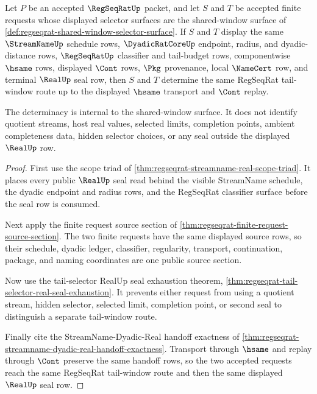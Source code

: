 \begin{theorem}
\label{thm:regseqrat-shared-window-selector-determinacy}
Let $P$ be an accepted $\RegSeqRatUp$ packet, and let $S$ and $T$ be accepted finite requests whose displayed selector surfaces are the shared-window surface of \autoref{def:regseqrat-shared-window-selector-surface}. If $S$ and $T$ display the same $\StreamNameUp$ schedule rows, $\DyadicRatCoreUp$ endpoint, radius, and dyadic-distance rows, $\RegSeqRatUp$ classifier and tail-budget rows, componentwise $\hsame$ rows, displayed $\Cont$ rows, $\Pkg$ provenance, local $\NameCert$ row, and terminal $\RealUp$ seal row, then $S$ and $T$ determine the same RegSeqRat tail-window route up to the displayed $\hsame$ transport and $\Cont$ replay.

The determinacy is internal to the shared-window surface. It does not identify quotient streams, host real values, selected limits, completion points, ambient completeness data, hidden selector choices, or any seal outside the displayed $\RealUp$ row.
\end{theorem}
\begin{proof}
First use the scope triad of \autoref{thm:regseqrat-streamname-real-scope-triad}. It places every public $\RealUp$ seal read behind the visible StreamName schedule, the dyadic endpoint and radius rows, and the RegSeqRat classifier surface before the seal row is consumed.

Next apply the finite request source section of \autoref{thm:regseqrat-finite-request-source-section}. The two finite requests have the same displayed source rows, so their schedule, dyadic ledger, classifier, regularity, transport, continuation, package, and naming coordinates are one public source section.

Now use the tail-selector RealUp seal exhaustion theorem, \autoref{thm:regseqrat-tail-selector-real-seal-exhaustion}. It prevents either request from using a quotient stream, hidden selector, selected limit, completion point, or second seal to distinguish a separate tail-window route.

Finally cite the StreamName-Dyadic-Real handoff exactness of \autoref{thm:regseqrat-streamname-dyadic-real-handoff-exactness}. Transport through $\hsame$ and replay through $\Cont$ preserve the same handoff rows, so the two accepted requests reach the same RegSeqRat tail-window route and then the same displayed $\RealUp$ seal row.
\end{proof}

